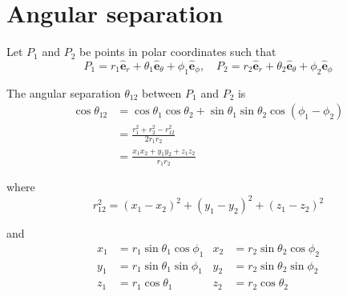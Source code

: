 

\section*{Angular separation}

Let $P_1$ and $P_2$ be points in polar coordinates such that
\begin{equation*}
P_1=r_1\hat{\mathbf e}_r+\theta_1\hat{\mathbf e}_\theta+\phi_1\hat{\mathbf e}_\phi,
\quad
P_2=r_2\hat{\mathbf e}_r+\theta_2\hat{\mathbf e}_\theta+\phi_2\hat{\mathbf e}_\phi
\end{equation*}

The angular separation $\theta_{12}$ between $P_1$ and $P_2$ is
\begin{align*}
\cos\theta_{12}
&=\cos\theta_1\cos\theta_2+\sin\theta_1\sin\theta_2\cos(\phi_1-\phi_2)
\\
&=\frac{r_1^2+r_2^2-r_{12}^2}{2r_1r_2}
\\
&=\frac{x_1x_2+y_1y_2+z_1z_2}{r_1r_2}
\end{align*}

where
\begin{equation*}
r_{12}^2=(x_1-x_2)^2+(y_1-y_2)^2+(z_1-z_2)^2
\end{equation*}

and
\begin{align*}
x_1&=r_1\sin\theta_1\cos\phi_1 & x_2&=r_2\sin\theta_2\cos\phi_2
\\
y_1&=r_1\sin\theta_1\sin\phi_1 & y_2&=r_2\sin\theta_2\sin\phi_2
\\
z_1&=r_1\cos\theta_1 & z_2&=r_2\cos\theta_2
\end{align*}


